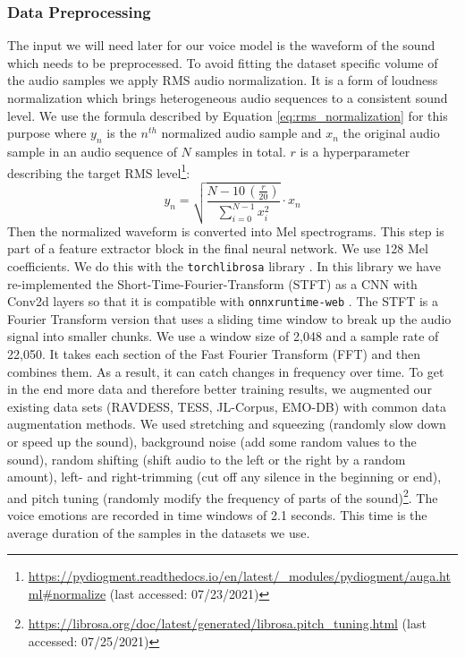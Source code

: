 \subsubsection{Data Preprocessing}
\label{subsubsec:method_vocal_emotion_recognition_data_preprocessing}
The input we will need later for our voice model is the waveform of the sound which needs to be preprocessed. To avoid fitting the dataset specific volume of the audio samples we apply RMS audio normalization. It is a form of loudness normalization which brings heterogeneous audio sequences to a consistent sound level. We use the formula described by Equation \ref{eq:rms_normalization} for this purpose where $y_n$ is the $n^{th}$ normalized audio sample and $x_n$ the original audio sample in an audio sequence of $N$ samples in total. $r$ is a hyperparameter describing the target RMS level\footnote{\url{https://pydiogment.readthedocs.io/en/latest/_modules/pydiogment/auga.html#normalize} (last accessed: 07/23/2021)}:
\begin{equation}
\label{eq:rms_normalization}
y_n=\sqrt{\frac{N-10\,(\frac{r}{20})}{\sum_{i=0}^{N-1}{x_i^2}}}\cdot{}x_n
\end{equation}
Then the normalized waveform is converted into Mel spectrograms. This step is part of a feature extractor block in the final neural network. We use 128 Mel coefficients. We do this with the \texttt{torchlibrosa} library \cite{kong_panns_2020}. In this library we have re-implemented the Short-Time-Fourier-Transform (STFT) as a CNN with Conv2d layers so that it is compatible with \texttt{onnxruntime-web} \cite{onnx_runtime_developers_onnx_2021}. The STFT is a Fourier Transform version that uses a sliding time window to break up the audio signal into smaller chunks. We use a window size of 2,048 and a sample rate of 22,050. It takes each section of the Fast Fourier Transform (FFT) and then combines them. As a result, it can catch changes in frequency over time. To get in the end more data and therefore better training results, we augmented our existing data sets (RAVDESS, TESS, JL-Corpus, EMO-DB) with common data augmentation methods. We used stretching and squeezing (randomly slow down or speed up the sound), background noise (add some random values to the sound), random shifting (shift audio to the left or the right by a random amount), left- and right-trimming (cut off any silence in the beginning or end), and pitch tuning (randomly modify the frequency of parts of the sound)\footnote{\url{ https://librosa.org/doc/latest/generated/librosa.pitch_tuning.html} (last accessed: 07/25/2021)}. The voice emotions are recorded in time windows of 2.1 seconds. This time is the average duration of the samples in the datasets we use.

